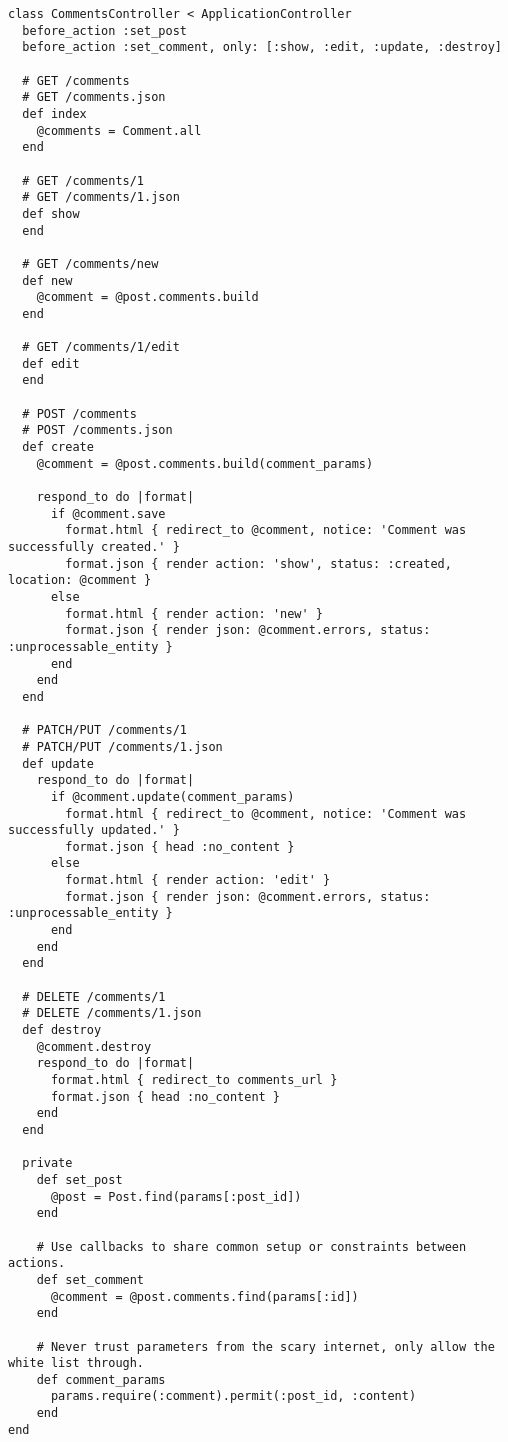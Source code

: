 \documentclass[a4paper]{book}
\begin{document}
\begin{shaded}\begin{verbatim}
class CommentsController < ApplicationController
  before_action :set_post
  before_action :set_comment, only: [:show, :edit, :update, :destroy]

  # GET /comments
  # GET /comments.json
  def index
    @comments = Comment.all
  end

  # GET /comments/1
  # GET /comments/1.json
  def show
  end

  # GET /comments/new
  def new
    @comment = @post.comments.build
  end

  # GET /comments/1/edit
  def edit
  end

  # POST /comments
  # POST /comments.json
  def create
    @comment = @post.comments.build(comment_params)

    respond_to do |format|
      if @comment.save
        format.html { redirect_to @comment, notice: 'Comment was successfully created.' }
        format.json { render action: 'show', status: :created, location: @comment }
      else
        format.html { render action: 'new' }
        format.json { render json: @comment.errors, status: :unprocessable_entity }
      end
    end
  end

  # PATCH/PUT /comments/1
  # PATCH/PUT /comments/1.json
  def update
    respond_to do |format|
      if @comment.update(comment_params)
        format.html { redirect_to @comment, notice: 'Comment was successfully updated.' }
        format.json { head :no_content }
      else
        format.html { render action: 'edit' }
        format.json { render json: @comment.errors, status: :unprocessable_entity }
      end
    end
  end

  # DELETE /comments/1
  # DELETE /comments/1.json
  def destroy
    @comment.destroy
    respond_to do |format|
      format.html { redirect_to comments_url }
      format.json { head :no_content }
    end
  end

  private
    def set_post
      @post = Post.find(params[:post_id])
    end

    # Use callbacks to share common setup or constraints between actions.
    def set_comment
      @comment = @post.comments.find(params[:id])
    end

    # Never trust parameters from the scary internet, only allow the white list through.
    def comment_params
      params.require(:comment).permit(:post_id, :content)
    end
end
\end{verbatim}\end{shaded}
\end{document}
